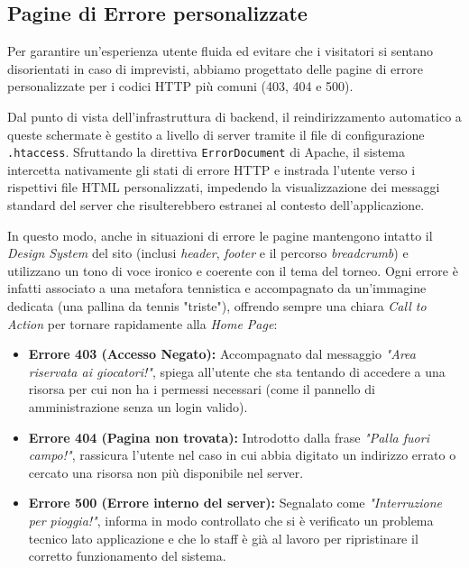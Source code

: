 \documentclass[11pt,a4paper]{article}
\begin{document}
\subsection{Pagine di Errore personalizzate}

Per garantire un'esperienza utente fluida ed evitare che i visitatori si sentano disorientati in caso di imprevisti, abbiamo progettato delle pagine di errore personalizzate per i codici HTTP più comuni (403, 404 e 500). 

Dal punto di vista dell'infrastruttura di backend, il reindirizzamento automatico a queste schermate è gestito a livello di server tramite il file di configurazione \texttt{.htaccess}. Sfruttando la direttiva \texttt{ErrorDocument} di Apache, il sistema intercetta nativamente gli stati di errore HTTP e instrada l'utente verso i rispettivi file HTML personalizzati, impedendo la visualizzazione dei messaggi standard del server che risulterebbero estranei al contesto dell'applicazione.

In questo modo, anche in situazioni di errore le pagine mantengono intatto il \textit{Design System} del sito (inclusi \textit{header}, \textit{footer} e il percorso \textit{breadcrumb}) e utilizzano un tono di voce ironico e coerente con il tema del torneo. Ogni errore è infatti associato a una metafora tennistica e accompagnato da un'immagine dedicata (una pallina da tennis "triste"), offrendo sempre una chiara \textit{Call to Action} per tornare rapidamente alla \textit{Home Page}:

\begin{itemize}
    \item \textbf{Errore 403 (Accesso Negato):} Accompagnato dal messaggio \textit{"Area riservata ai giocatori!"}, spiega all'utente che sta tentando di accedere a una risorsa per cui non ha i permessi necessari (come il pannello di amministrazione senza un login valido).
    \item \textbf{Errore 404 (Pagina non trovata):} Introdotto dalla frase \textit{"Palla fuori campo!"}, rassicura l'utente nel caso in cui abbia digitato un indirizzo errato o cercato una risorsa non più disponibile nel server.
    \item \textbf{Errore 500 (Errore interno del server):} Segnalato come \textit{"Interruzione per pioggia!"}, informa in modo controllato che si è verificato un problema tecnico lato applicazione e che lo staff è già al lavoro per ripristinare il corretto funzionamento del sistema.
\end{itemize}
\end{document}

